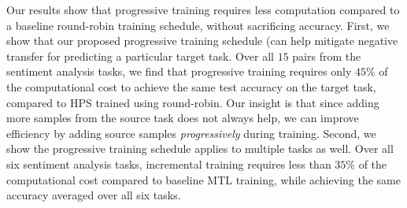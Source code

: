 Our results show that progressive training requires less computation compared to a baseline round-robin training schedule, without sacrificing accuracy.
First, we show that our proposed progressive training schedule (can help mitigate negative transfer for predicting a particular target task.
Over all $15$ pairs from the sentiment analysis tasks, we find that progressive training requires only $45\%$ of the computational cost to achieve the same test accuracy on the target task, compared to HPS trained using round-robin.
Our insight is that since adding more samples from the source task does not always help, we can improve efficiency by adding source samples \textit{progressively} during training.
Second, we show the progressive training schedule applies to multiple tasks as well.
Over all six sentiment analysis tasks, incremental training requires less than $35\%$ of the computational cost compared to baseline MTL training, while achieving the same accuracy averaged over all six tasks.


